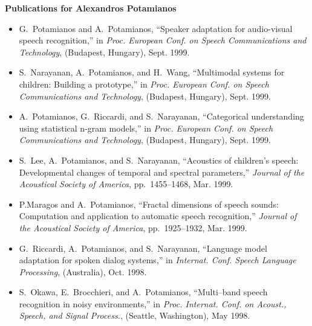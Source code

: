 

\pagestyle{empty}



\begin{center}
\LARGE {\bf Publications for Alexandros Potamianos}
\end{center}

\vspace*{3mm}

\begin{itemize}

\item
G.~Potamianos and A.~Potamianos, ``Speaker adaptation for audio-visual speech
  recognition,'' in {\em Proc. European Conf. on Speech Communications and
  Technology}, (Budapest, Hungary), Sept. 1999.

\item
S.~Narayanan, A.~Potamianos, and H.~Wang, ``Multimodal systems for children:
  Building a prototype,'' in {\em Proc. European Conf. on Speech Communications
  and Technology}, (Budapest, Hungary), Sept. 1999.

\item
A.~Potamianos, G.~Riccardi, and S.~Narayanan, ``Categorical understanding using
  statistical n-gram models,'' in {\em Proc. European Conf. on Speech
  Communications and Technology}, (Budapest, Hungary), Sept. 1999.

\item
S.~Lee, A.~Potamianos, and S.~Narayanan, ``Acoustics of children's speech:
  Developmental changes of temporal and spectral parameters,'' {\em Journal of
  the Acoustical Society of America}, pp.~1455--1468, Mar. 1999.

\item
P.Maragos and A.~Potamianos, ``Fractal dimensions of speech sounds: Computation
  and application to automatic speech recognition,'' {\em Journal of the
  Acoustical Society of America}, pp.~1925--1932, Mar. 1999.

\item
G.~Riccardi, A.~Potamianos, and S.~Narayanan, ``Language model adaptation for
  spoken dialog systems,'' in {\em Internat. Conf. Speech Language Processing},
  (Australia), Oct. 1998.

\item
S.~Okawa, E.~Brocchieri, and A.~Potamianos, ``Multi--band speech recognition in
  noisy environments,'' in {\em Proc. Internat. Conf. on Acoust., Speech, and
  Signal Process.}, (Seattle, Washington), May 1998.


\end{itemize}
